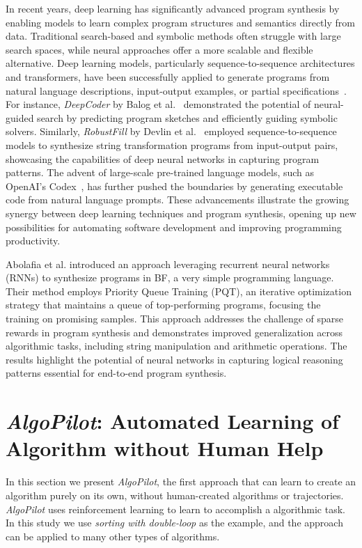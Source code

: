 \documentclass[pdflatex,sn-mathphys-num]{sn-jnl}%
\theoremstyle{thmstyleone}%
\theoremstyle{thmstyletwo}%
\theoremstyle{thmstylethree}%
\begin{document}
In recent years, deep learning has significantly advanced program synthesis by enabling models to learn complex program structures and semantics directly from data. Traditional search-based and symbolic methods often struggle with large search spaces, while neural approaches offer a more scalable and flexible alternative. Deep learning models, particularly sequence-to-sequence architectures and transformers, have been successfully applied to generate programs from natural language descriptions, input-output examples, or partial specifications~\cite{devlin2017robustfill, balog2017deepcoder}. For instance, \textit{DeepCoder} by Balog et al.~\cite{balog2017deepcoder} demonstrated the potential of neural-guided search by predicting program sketches and efficiently guiding symbolic solvers. Similarly, \textit{RobustFill} by Devlin et al.~\cite{devlin2017robustfill} employed sequence-to-sequence models to synthesize string transformation programs from input-output pairs, showcasing the capabilities of deep neural networks in capturing program patterns. The advent of large-scale pre-trained language models, such as OpenAI's Codex~\cite{chen2021evaluating}, has further pushed the boundaries by generating executable code from natural language prompts. These advancements illustrate the growing synergy between deep learning techniques and program synthesis, opening up new possibilities for automating software development and improving programming productivity.

Abolafia et al. \cite{abolafia2018neural} introduced an approach leveraging recurrent neural networks (RNNs) to synthesize programs in BF, a very simple programming language. Their method employs Priority Queue Training (PQT), an iterative optimization strategy that maintains a queue of top-performing programs, focusing the training on promising samples. This approach addresses the challenge of sparse rewards in program synthesis and demonstrates improved generalization across algorithmic tasks, including string manipulation and arithmetic operations. The results highlight the potential of neural networks in capturing logical reasoning patterns essential for end-to-end program synthesis.

\section{\emph{AlgoPilot}: Automated Learning of Algorithm without Human Help}

In this section we present \emph{AlgoPilot}, the first approach that can learn to create an algorithm purely on its own, without human-created algorithms or trajectories. \emph{AlgoPilot} uses reinforcement learning to learn to accomplish a algorithmic task. In this study we use \emph{sorting with double-loop} as the example, and the approach can be applied to many other types of algorithms.
\end{document}
